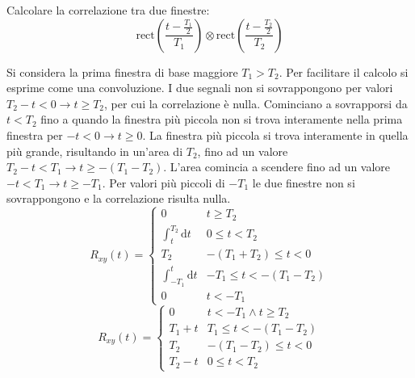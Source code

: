 \documentclass{article}
\newcommand{\rect}{\mbox{rect}}
\newcommand{\df}{\mathrm{d}}
\begin{document}
Calcolare la correlazione tra due finestre:
\begin{equation*}
    \rect\displaystyle\left(\frac{t-\frac{T_1}{2}}{T_1}\right)\otimes\rect\left(\frac{t-\frac{T_2}{2}}{T_2}\right)
\end{equation*}

Si considera la prima finestra di base maggiore $T_1>T_2$. Per facilitare il calcolo si esprime come una convoluzione. I due segnali non si sovrappongono per valori 
$T_2-t<0\to t\geq T_2$, per cui la correlazione è nulla. Cominciano a sovrapporsi da $t<T_2$ fino a quando la finestra più piccola non si trova interamente nella prima 
finestra per $-t<0\to t\geq0$. La finestra più piccola si trova interamente in quella più grande, risultando in un'area di $T_2$, fino ad un valore 
$T_2-t<T_1\to t\geq -(T_1-T_2)$. L'area comincia a scendere fino ad un valore $-t<T_1\to t\geq -T_1$. Per valori più piccoli di $-T_1$ le due finestre non si sovrappongono e la 
correlazione risulta nulla.
\begin{equation*}
    R_{xy}(t)=\begin{cases}
        0&t\geq T_2\\
        \displaystyle\int_t^{T_2}\df t& 0\leq t<T_2\\
        T_2& -(T_1+T_2)\leq t<0\\
        \displaystyle\int_{-T_1}^t\df t& -T_1\leq t<-(T_1-T_2)\\
        0&t<-T_1
    \end{cases}
\end{equation*}
\begin{equation}
    R_{xy}(t)=\begin{cases}
        0& t<-T_1\land t\geq T_2\\
        T_1+t& T_1\leq t<-(T_1-T_2)\\
        T_2& -(T_1-T_2)\leq t<0\\
        T_2-t &  0\leq t<T_2
    \end{cases}
\end{equation}
\end{document}
